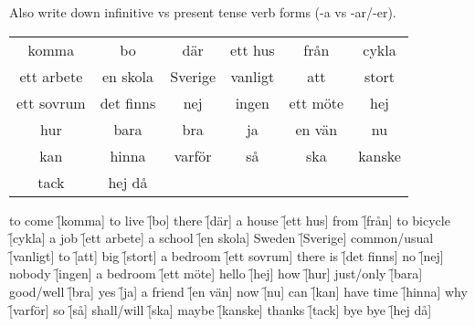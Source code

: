\begin{flushleft}
    Also write down infinitive vs present tense verb forms (-a vs -ar/-er).
\end{flushleft}
\begin{center}
    \begin{tabular}{|c c c c c c|}
        \hline
        komma & bo & där & ett hus & från & cykla \\
        ett arbete & en skola & Sverige & vanligt & att & stort \\
        ett sovrum & det finns & nej & ingen & ett möte & hej \\
        hur & bara & bra & ja & en vän & nu \\
        kan & hinna & varför & så & ska & kanske \\
        tack & hej då &&&& \\
        \hline
    \end{tabular}
\end{center}

\begin{questions}
    \begin{multicols}{2}
        \raggedcolumns
        \question to come \f[komma]
        \question to live \f[bo]
        \question there \f[där]
        \question a house \f[ett hus]
        \question from \f[från]
        \question to bicycle \f[cykla]
        \question a job \f[ett arbete]
        \question a school \f[en skola]
        \question Sweden \f[Sverige]
        \question common/usual \f[vanligt]
        \question to \f[att]
        \question big \f[stort]
        \question a bedroom \f[ett sovrum]
        \question there is \f[det finns]
        \question no \f[nej]
        \question nobody \f[ingen]
        \question a bedroom \f[ett möte]
        \question hello \f[hej]
        \question how \f[hur]
        \question just/only \f[bara]
        \question good/well \f[bra]
        \question yes \f[ja]
        \question a friend \f[en vän]
        \question now \f[nu]
        \question can \f[kan]
        \question have time \f[hinna]
        \question why \f[varför]
        \question so \f[så]
        \question shall/will \f[ska]
        \question maybe \f[kanske]
        \question thanks \f[tack]
        \question bye bye \f[hej då]
    \end{multicols}
\end{questions}